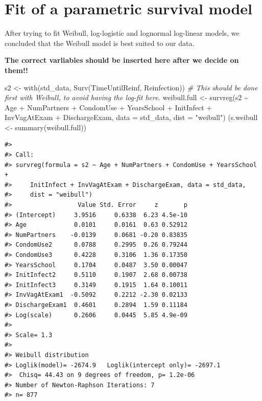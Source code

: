 \documentclass[
]{article}
\newenvironment{Shaded}{\begin{snugshade}}{\end{snugshade}}
\newcommand{\AttributeTok}[1]{\textcolor[rgb]{0.77,0.63,0.00}{#1}}
\newcommand{\CommentTok}[1]{\textcolor[rgb]{0.56,0.35,0.01}{\textit{#1}}}
\newcommand{\FunctionTok}[1]{\textcolor[rgb]{0.00,0.00,0.00}{#1}}
\newcommand{\NormalTok}[1]{#1}
\newcommand{\OtherTok}[1]{\textcolor[rgb]{0.56,0.35,0.01}{#1}}
\newcommand{\SpecialCharTok}[1]{\textcolor[rgb]{0.00,0.00,0.00}{#1}}
\newcommand{\StringTok}[1]{\textcolor[rgb]{0.31,0.60,0.02}{#1}}
\begin{document}
\hypertarget{fit-of-a-parametric-survival-model}{%
\section{Fit of a parametric survival model}\label{fit-of-a-parametric-survival-model}}

After trying to fit Weibull, log-logistic and lognormal log-linear models, we concluded that the Weibull model is best suited to our data.

\textbf{The correct varliables should be inserted here after we decide on them!!}

\begin{Shaded}
\begin{Highlighting}[]
\NormalTok{s2 }\OtherTok{\textless{}{-}} \FunctionTok{with}\NormalTok{(std\_data, }\FunctionTok{Surv}\NormalTok{(TimeUntilReinf, Reinfection))}
\CommentTok{\# This should be done first with Weibull, to avoid having the log{-}fit here. }
\NormalTok{weibull.full  }\OtherTok{\textless{}{-}} \FunctionTok{survreg}\NormalTok{(s2 }\SpecialCharTok{\textasciitilde{}}\NormalTok{ Age }\SpecialCharTok{+}\NormalTok{ NumPartners }\SpecialCharTok{+}\NormalTok{ CondomUse }\SpecialCharTok{+}\NormalTok{ YearsSchool }
                  \SpecialCharTok{+}\NormalTok{ InitInfect }\SpecialCharTok{+}\NormalTok{ InvVagAtExam }\SpecialCharTok{+}\NormalTok{ DischargeExam, }\AttributeTok{data =}\NormalTok{ std\_data, }\AttributeTok{dist =} \StringTok{"weibull"}\NormalTok{)}
\NormalTok{(s.weibull }\OtherTok{\textless{}{-}} \FunctionTok{summary}\NormalTok{(weibull.full))}
\end{Highlighting}
\end{Shaded}

\begin{verbatim}
#> 
#> Call:
#> survreg(formula = s2 ~ Age + NumPartners + CondomUse + YearsSchool + 
#>     InitInfect + InvVagAtExam + DischargeExam, data = std_data, 
#>     dist = "weibull")
#>                  Value Std. Error     z       p
#> (Intercept)     3.9516     0.6338  6.23 4.5e-10
#> Age             0.0101     0.0161  0.63 0.52912
#> NumPartners    -0.0139     0.0681 -0.20 0.83835
#> CondomUse2      0.0788     0.2995  0.26 0.79244
#> CondomUse3      0.4228     0.3106  1.36 0.17350
#> YearsSchool     0.1704     0.0487  3.50 0.00047
#> InitInfect2     0.5110     0.1907  2.68 0.00738
#> InitInfect3     0.3149     0.1915  1.64 0.10011
#> InvVagAtExam1  -0.5092     0.2212 -2.30 0.02133
#> DischargeExam1  0.4601     0.2894  1.59 0.11184
#> Log(scale)      0.2606     0.0445  5.85 4.9e-09
#> 
#> Scale= 1.3 
#> 
#> Weibull distribution
#> Loglik(model)= -2674.9   Loglik(intercept only)= -2697.1
#>  Chisq= 44.43 on 9 degrees of freedom, p= 1.2e-06 
#> Number of Newton-Raphson Iterations: 7 
#> n= 877
\end{verbatim}
\end{document}
